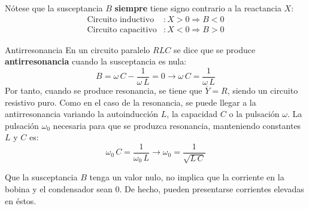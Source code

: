 \documentclass[11pt]{book} %
\makeatletter
\numberwithin{dummy}{section}
\theoremstyle{ocrenumbox}
\theoremstyle{blacknumex}
\theoremstyle{blacknumbox}
\theoremstyle{ocrenum}
\newenvironment{remark}{\par\vspace{10pt}\small %
\begin{list}{}{
\leftmargin=35pt %
\rightmargin=25pt}\item\ignorespaces %
\makebox[-2.5pt]{\begin{tikzpicture}[overlay]
\node[draw=ocre!60,line width=1pt,circle,fill=ocre!25,font=\sffamily\bfseries,inner sep=2pt,outer sep=0pt] at (-15pt,0pt){\textcolor{ocre}{N}};\end{tikzpicture}} %
\advance\baselineskip -1pt}{\end{list}\vskip5pt} %
\renewcommand{\subsection}{\@startsection {subsection}{2}{\z@}
{-3ex \@plus -0.1ex \@minus -.4ex}
{0.5ex \@plus.2ex }
{\normalfont\sffamily\bfseries}}
\newlength\esp
\makeatother
\begin{document}
	\begin{remark}
		Nótese que la susceptancia $B$ \textbf{siempre} tiene signo contrario a la reactancia $X$:
		\begin{align*}
			\text{Circuito inductivo}&: X > 0 \Rightarrow B<0\\
			\text{Circuito capacitivo}&: X < 0 \Rightarrow B>0
		\end{align*}
	\end{remark}
	
	\subsection{Antirresonancia}
	En un circuito paralelo $RLC$ se dice que se produce \textbf{antirresonancia} cuando la susceptancia es nula:
	\begin{equation*}
		B=\omega\,C-\dfrac{1}{\omega\,L}=0\rightarrow \omega\,C=\dfrac{1}{\omega\,L}
	\end{equation*}
	Por tanto, cuando se produce resonancia, se tiene que $\overline{Y}=R$, siendo un circuito resistivo puro. Como en el caso de la resonancia, se puede llegar a la antirresonancia variando la autoinducción $L$, la capacidad $C$ o la pulsación $\omega$. La pulsación $\omega_0$ necesaria para que se produzca resonancia, manteniendo constantes $L$ y $C$ es:
	\begin{equation}
		\omega_0\,C=\dfrac{1}{\omega_0\,L}\rightarrow \boxed{\omega_0=\dfrac{1}{\sqrt{L\,C}}}
	\end{equation}
	\begin{remark}
		Que la susceptancia $B$ tenga un valor nulo, no implica que la corriente en la bobina y el condensador sean 0. De hecho, pueden presentarse corrientes elevadas en éstos.
	\end{remark}
	
\end{document}
